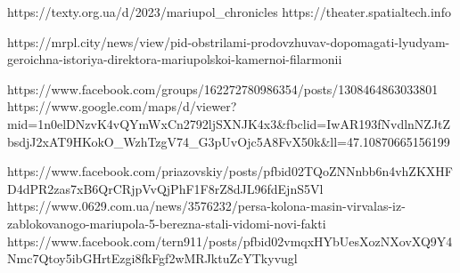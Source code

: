  
 
 
 
 


https://texty.org.ua/d/2023/mariupol_chronicles
https://theater.spatialtech.info

https://mrpl.city/news/view/pid-obstrilami-prodovzhuvav-dopomagati-lyudyam-geroichna-istoriya-direktora-mariupolskoi-kamernoi-filarmonii

https://www.facebook.com/groups/162272780986354/posts/1308464863033801
https://www.google.com/maps/d/viewer?mid=1n0elDNzvK4vQYmWxCn2792ljSXNJK4x3&fbclid=IwAR193fNvdlnNZJtZbsdjJ2xAT9HKokO_WzhTzgV74_G3pUvOjc5A8FvX50k&ll=47.10870665156199%

https://www.facebook.com/priazovskiy/posts/pfbid02TQoZNNnbb6n4vhZKXHFD4dPR2zas7xB6QrCRjpVvQjPhF1F8rZ8dJL96fdEjnS5Vl
https://www.0629.com.ua/news/3576232/persa-kolona-masin-virvalas-iz-zablokovanogo-mariupola-5-berezna-stali-vidomi-novi-fakti
https://www.facebook.com/tern911/posts/pfbid02vmqxHYbUesXozNXovXQ9Y4Nmc7Qtoy5ibGHrtEzgi8fkFgf2wMRJktuZcYTkyvugl
